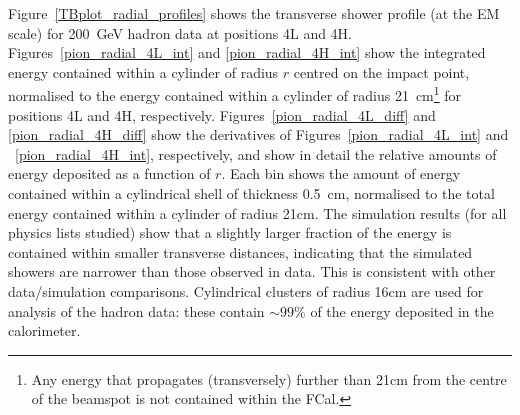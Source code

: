 Figure~\ref{TBplot_radial_profiles} shows the transverse shower profile (at the EM scale) for 200~GeV hadron data at positions 4L and 4H.  %
Figures~\ref{pion_radial_4L_int} and \ref{pion_radial_4H_int} show the integrated energy contained within a cylinder of radius $r$ centred on the impact point, normalised to the energy contained within a cylinder of radius 21~cm\footnote{Any energy that propagates (transversely) further than 21cm from the centre of the beamspot is not contained within the FCal.} for positions 4L and 4H, respectively. Figures~\ref{pion_radial_4L_diff} and \ref{pion_radial_4H_diff} show the derivatives of Figures~\ref{pion_radial_4L_int} and ~\ref{pion_radial_4H_int}, respectively, and show in detail the relative amounts of energy deposited as a function of $r$. Each bin shows the amount of energy contained within a cylindrical shell of thickness 0.5~cm, normalised to the total energy contained within a cylinder of radius 21cm. The simulation results (for all physics lists studied) show that a slightly larger fraction of the energy is contained within smaller transverse distances, indicating that the simulated showers are narrower than those observed in data. This is consistent with other \atlas data/simulation comparisons\cite{TB2004pub,CTB_localHadCal,calpub2010}. Cylindrical clusters of radius 16cm are used for analysis of the hadron data: these contain $\sim 99\%$ of the energy deposited in the calorimeter. 




